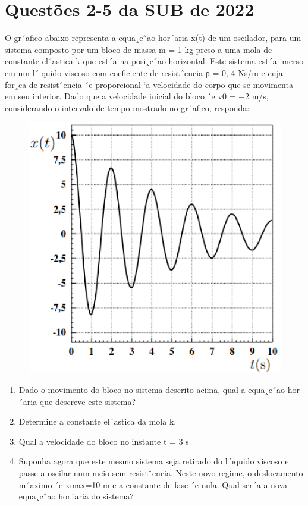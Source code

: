 \documentclass[a4paper,12pt]{article}
\begin{document}
\section{Questões 2-5 da SUB de 2022}

O gr´afico abaixo representa a equa¸c˜ao hor´aria x(t) de um oscilador,
para um sistema composto por um bloco de massa m = 1 kg preso a uma mola de constante el´astica
k que est´a na posi¸c˜ao horizontal. Este sistema est´a imerso em um l´ıquido viscoso com coeficiente
de resistˆencia ρ = 0, 4 Ns/m e cuja for¸ca de resistˆencia ´e proporcional `a velocidade do corpo que se
movimenta em seu interior. Dado que a velocidade inicial do bloco ´e v0 = −2 m/s, considerando o
intervalo de tempo mostrado no gr´afico, responda:

\begin{figure}[H]
\centering
\includegraphics[width=0.6\linewidth]{fig/grafico_sub}
\label{fig:grafico_sub}
\end{figure}

\begin{enumerate}
\item Dado o movimento do bloco no sistema descrito acima, qual a equa¸c˜ao hor´aria que
descreve este sistema?

\item Determine a constante el´astica da mola k.

\item Qual a velocidade do bloco no instante t = 3 s

\item Suponha agora que este mesmo sistema seja retirado do l´ıquido viscoso e passe a
oscilar num meio sem resistˆencia. Neste novo regime, o deslocamento m´aximo ´e xmax=10 m e a
constante de fase ´e nula. Qual ser´a a nova equa¸c˜ao hor´aria do sistema?
\end{enumerate}
\end{document}
